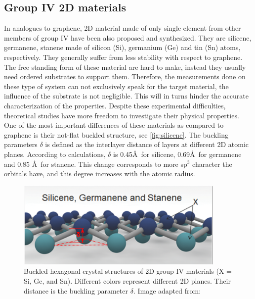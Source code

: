 \subsection{Group IV 2D materials}

In analogues to graphene, 2D material made of only single element from other members of group IV have been also proposed and synthesized. They are silicene, germanene, stanene made of silicon (Si), germanium (Ge) and tin (Sn) atoms, respectively. They generally suffer from less stability with respect to graphene. The free standing form of these material are hard to make, instead they usually need ordered substrates to support them. Therefore, the measurements done on these type of system can not exclusively speak for the target material, the influence of the substrate is not negligible\cite{Lin2013}. This will in turns hinder the accurate characterization of the properties. Despite these experimental difficulties, theoretical studies have more freedom to investigate their physical properties. One of the most important differences of these materials as compared to graphene is their not-flat buckled structure, see \autoref{fig:silicene}. The buckling parameters $\delta$ is defined as the interlayer distance of layers at different 2D atomic planes. According to calculations, $\delta$ is 0.45\AA~for silicene, 0.69\AA~for germanene and 0.85 \AA~for stanene\cite{matthes2013}. This change corresponds to more sp$^3$ character the orbitals have, and this degree increases with the atomic radius. 

\begin{figure}[htbp!] 
\centering  
\includegraphics[width=0.9\textwidth]{silicene_structure.png}
\caption{Buckled hexagonal crystal structures of 2D group IV materials (X = Si, Ge, and Sn). Different colors represent different 2D planes. Their distance is the buckling parameter $\delta$. Image adapted from:\cite{Balendhran2015}}  
\label{fig:silicene}
\end{figure} 


